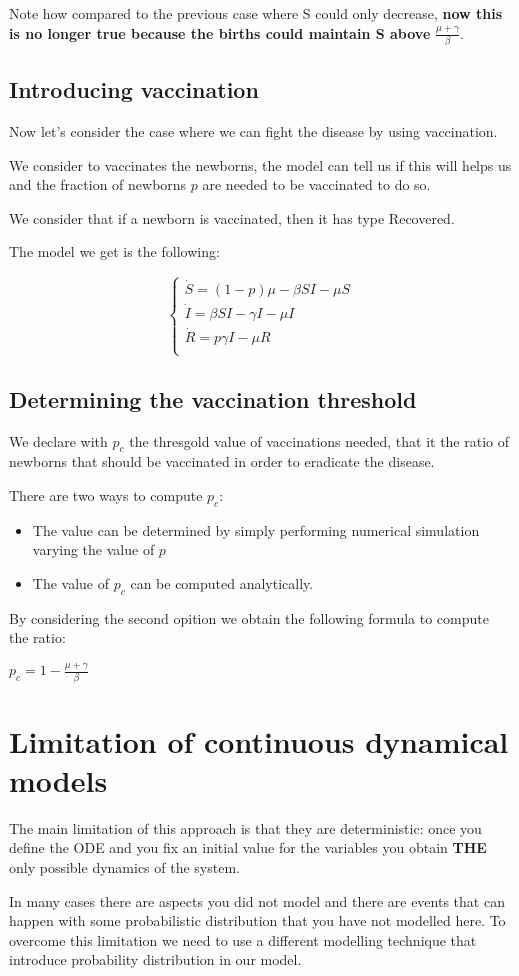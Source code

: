 Note how compared to the previous case where S could only decrease, \textbf{now this is no longer true because the births could maintain S above} $\frac{\mu + \gamma}{\beta}$.

\subsection{Introducing vaccination}
Now let's consider the case where we can fight the disease by using vaccination.\par
We consider to vaccinates the newborns, the model can tell us if this will helps us and the fraction of newborns $p$ are needed to be vaccinated to do so. \par
We consider that if a newborn is vaccinated, then it has type Recovered.\par
The model we get is the following:

\[
\begin{cases}
        \dot{S} = (1-p)\mu - \beta S I - \mu S \\
        \dot{I} = \beta S I - \gamma I - \mu I\\
        \dot{R} = p \gamma I - \mu R\\
\end{cases}
\]

\subsection{Determining the vaccination threshold}
We declare with $p_c$ the thresgold value of vaccinations needed, that it the ratio of newborns that should be vaccinated in order to eradicate the disease.\par
There are two ways to compute $p_c$:

\begin{itemize}
    \item The value can be determined by simply performing numerical simulation varying the value of $p$

    \item The value of $p_c$ can be computed analytically.
\end{itemize}

By considering the second opition we obtain the following formula to compute the ratio:
 \begin{center}
     $p_c = 1 - \frac{\mu + \gamma}{\beta}$ 
 \end{center}

\section{Limitation of continuous dynamical models}
The main limitation of this approach is that they are deterministic: once you define the ODE and you fix an initial value for the variables you obtain \textbf{THE} only possible dynamics of the system. \par
In many cases there are aspects you did not model and there are events that can happen with some probabilistic distribution that you have not modelled here. To overcome this limitation we need to use a different modelling technique that introduce probability distribution in our model.

 